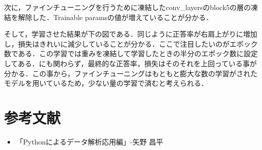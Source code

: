 \documentclass[uplatex,titlepage]{jsarticle}
\newif\iffigure
\begin{document}
次に，ファインチューニングを行うために凍結したconv\_layersのblock5の層の凍結を解除した．Trainable paramsの値が増えていることが分かる．\par
そして，学習させた結果が下の図である．同じように正答率が右肩上がりに増加し，損失はきれいに減少していることが分かる．ここで注目したいのがエポック数である．この学習では重みを凍結して学習したときの半分のエポック数に設定してある．にも関わらず，最終的な正答率，損失はそのそれを上回っている事が分かる．この事から，ファインチューニングはもともと膨大な数の学習がされたモデルを用いているため，少ない量の学習で済むと考えられる．
\iffigure
\begin{figure}[H]%
    \begin{center}
    \texttt{[image: finetyu\_after.png]} 
    \caption{凍結解除後のモデル}
    \end{center}
\end{figure}
\fi

\iffigure
\begin{figure}[H]
\begin{minipage}{8cm}%
  \begin{center}
   \texttt{[image: finetyu\_after\_acc.png]} \\
   \caption{凍結解除して学習したときの正答率の推移}
  \end{center}
\end{minipage}
\hfill
\begin{minipage}{8cm}%
  \begin{center}
    \texttt{[image: finetyu\_after\_loss.png]} \\
    \caption{凍結解除して学習したときの損失の推移}
  \end{center}
\end{minipage}
\end{figure}
\fi



\section{参考文献}
\begin{itemize}
  \item 「Pythonによるデータ解析応用編」-矢野 昌平
\end{itemize}
\end{document}
